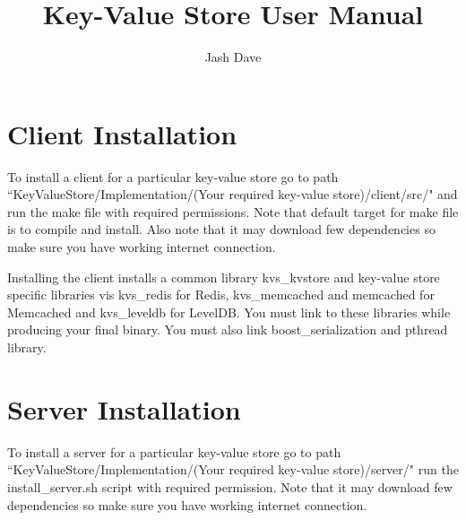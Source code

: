 \documentclass[11pt]{article}
\title{\textbf{Key-Value Store User Manual}}
\author{Jash Dave}
\date{}
\begin{document}
\maketitle

\section{Client Installation}
To install a client for a particular key-value store go to path \\ ``KeyValueStore/Implementation/(Your required key-value store)/client/src/" and run the make file with required permissions. Note that default target for make file is to compile and install. Also note that it may download few dependencies so make sure you have working internet connection.

Installing the client installs a common library kvs\_kvstore and key-value store specific libraries vis kvs\_redis for Redis, kvs\_memcached and memcached for Memcached and kvs\_leveldb for LevelDB. You must link to these libraries while producing your final binary. You must also link boost\_serialization and pthread library.

\section{Server Installation}
To install a server for a particular key-value store go to path \\ ``KeyValueStore/Implementation/(Your required key-value store)/server/" run the install\_server.sh script with required permission. Note that it may download few dependencies so make sure you have working internet connection.
\end{document}
